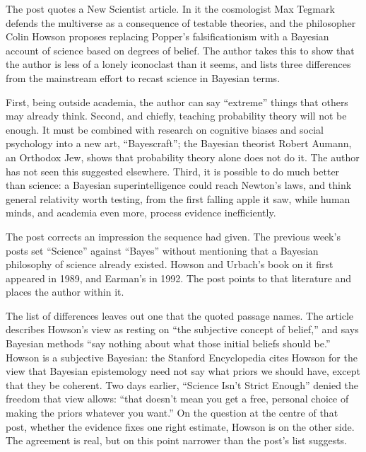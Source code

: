 \begin{afterword}
\summaryhead

The post quotes a New Scientist article. In it the cosmologist Max Tegmark defends the multiverse as a consequence of testable theories, and the philosopher Colin Howson proposes replacing Popper's falsificationism with a Bayesian account of science based on degrees of belief. The author takes this to show that the author is less of a lonely iconoclast than it seems, and lists three differences from the mainstream effort to recast science in Bayesian terms.

First, being outside academia, the author can say ``extreme'' things that others may already think. Second, and chiefly, teaching probability theory will not be enough. It must be combined with research on cognitive biases and social psychology into a new art, ``Bayescraft''; the Bayesian theorist Robert Aumann, an Orthodox Jew, shows that probability theory alone does not do it. The author has not seen this suggested elsewhere. Third, it is possible to do much better than science: a Bayesian superintelligence could reach Newton's laws, and think general relativity worth testing, from the first falling apple it saw, while human minds, and academia even more, process evidence inefficiently.

\responsehead

The post corrects an impression the sequence had given. The previous week's posts set ``Science'' against ``Bayes'' without mentioning that a Bayesian philosophy of science already existed. Howson and Urbach's book on it first appeared in 1989, and Earman's in 1992. The post points to that literature and places the author within it.

The list of differences leaves out one that the quoted passage names. The article describes Howson's view as resting on ``the subjective concept of belief,'' and says Bayesian methods ``say nothing about what those initial beliefs should be.'' Howson is a subjective Bayesian: the Stanford Encyclopedia cites Howson for the view that Bayesian epistemology need not say what priors we should have, except that they be coherent. Two days earlier, ``Science Isn't Strict Enough'' denied the freedom that view allows: ``that doesn't mean you get a free, personal choice of making the priors whatever you want.'' On the question at the centre of that post, whether the evidence fixes one right estimate, Howson is on the other side. The agreement is real, but on this point narrower than the post's list suggests.


\end{afterword}
